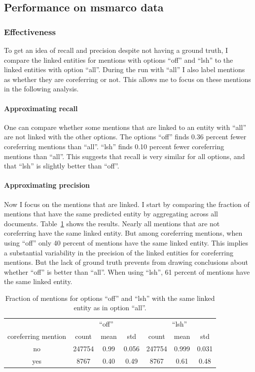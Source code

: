 \documentclass[a4paper,11pt]{article}
\numberwithin{equation}{section} %
\begin{document}
\subsection{Performance on msmarco data}

\subsubsection{Effectiveness}

To get an idea of recall and precision despite not having a ground truth, I compare the linked entities for mentions with options ``off'' and ``lsh'' to the linked entities with option ``all''. 
During the run with ``all'' I also label mentions as whether they are coreferring or not. This allows me to focus on these mentions in the following analysis.


\paragraph{Approximating recall}
One can compare whether some mentions that are linked to an entity with ``all'' are not linked with the other options. 
The options ``off'' finds 0.36 percent fewer coreferring mentions than ``all''. ``lsh'' finds 0.10 percent fewer coreferring mentions than ``all''.
This suggests that recall is very similar for all options, and that ``lsh'' is slightly better than ``off''. 


\paragraph{Approximating precision}
Now I focus on the mentions that are linked. I start by comparing the fraction of mentions that have the same predicted entity by aggregating across all documents. Table~\ref{tab:performance_msmarco_avg} shows the results.
Nearly all mentions that are not coreferring have the same linked entity. 
But among coreferring mentions, when using ``off'' only 40 percent of mentions have the same linked entity. 
This implies a substantial variability in the precision of the linked entities for coreferring mentions. But the lack of ground truth prevents from drawing conclusions about whether ``off'' is better than ``all''. 
When using ``lsh'', 61 percent of mentions have the same linked entity.

\begin{table}
 \begin{tabular}{c c c c c c c}
 \hline
    & \multicolumn{3}{c}{``off''} & \multicolumn{3}{c}{``lsh''} \\
   coreferring mention & count & mean & std & count & mean & std \\
 \hline 
 no & 247754 & 0.99 & 0.056 & 247754 &	0.999 &	0.031 \\  
 yes & 8767 & 0.40 & 0.49 & 8767 & 0.61   &	0.48	 \\ 
\hline 
\end{tabular}
\caption{Fraction of mentions for options ``off'' and ``lsh'' with the same linked entity as in option ``all''.}
\label{tab:performance_msmarco_avg}
\end{table}
\end{document}
